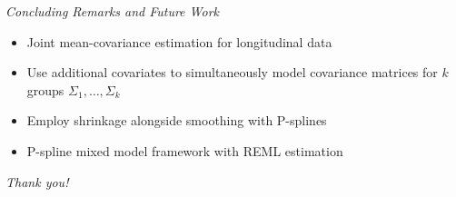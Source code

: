 

\begin{frame}[c]{\textit{Concluding Remarks and Future Work}}

\begin{itemize}
\item Joint mean-covariance estimation for longitudinal data 
\item Use additional covariates to simultaneously model covariance matrices for $k$ groups $\Sigma_1, \dots, \Sigma_k$   
\item Employ shrinkage alongside smoothing with P-splines 
\item  P-spline mixed model framework with REML estimation
\end{itemize}

\end{frame}


\begin{frame}[c]{\textit{Thank you!}}

\end{frame}


%
%




